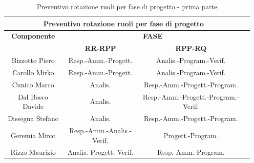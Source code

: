 \newpage

\begin{table}[!h]
	\begin{center}
		  \begin{tabular}
			  {|c|c|c|c|}
		 \hline
			\multicolumn{3}{|c|}{ \textbf{Preventivo rotazione ruoli per fase di progetto} } \\
			\hline
			\textbf{Componente} & \multicolumn{2}{|c|}{ \textbf{FASE} } \\
			\hline
			& \textbf{RR-RPP} & \textbf{RPP-RQ} \\
			\hline
			Bizzotto Piero & Resp.-Amm.-Progett.  & Analis.-Program.-Verif. \\
			\hline
			Carollo Mirko & Resp.-Amm.-Progett.  & Analis.-Program.-Verif.   \\
			\hline
			Cunico Marco & Analis.  & Resp.-Amm.-Progett.-Program.  \\
			\hline
			Dal Bosco Davide & Analis.  & Resp.-Amm.-Progett.-Program.-Verif.  \\
			\hline
			Dissegna Stefano & Analis.  & Resp.-Amm.-Progett.-Program.  \\
			\hline
			Geremia Mirco & Resp.-Amm.-Analis.-Verif.  & Progett.-Program.  \\
			\hline
			Rizzo Maurizio & Analis.-Progett.-Verif. & Resp.-Amm.-Program. \\
			\hline

		\end{tabular}
	\caption{Preventivo rotazione ruoli per fase di progetto - prima parte} %
	\label{tab:TabellaRotazRuoliUno}
	\end{center}	
\end{table}

